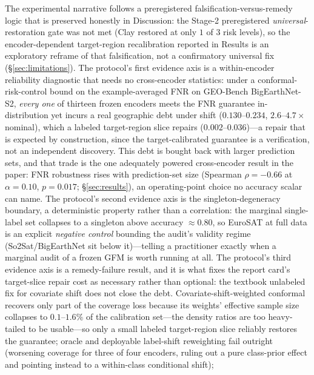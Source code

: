 \documentclass[preprint,11pt,authoryear]{elsarticle}
\begin{document}
 The experimental narrative follows a
preregistered falsification-versus-remedy logic that is preserved honestly in Discussion: the Stage-2 preregistered
\emph{universal}-restoration gate was not met (Clay restored at only $1$ of $3$ risk levels), so the
encoder-dependent target-region recalibration reported in Results is an exploratory reframe of that
falsification, not a confirmatory universal fix (\S\ref{sec:limitations}). The protocol's first evidence
axis is a within-encoder reliability diagnostic that needs no cross-encoder statistics: under a
conformal-risk-control \citep{angelopoulos2024crc} bound on the example-averaged FNR
on GEO-Bench BigEarthNet-S2, \emph{every one} of thirteen frozen encoders meets the FNR guarantee
in-distribution yet incurs a real geographic debt under shift ($0.130$--$0.234$, $2.6$--$4.7\times$
nominal), which a labeled target-region slice repairs ($0.002$--$0.036$)---a repair that is expected by
construction, since the target-calibrated guarantee is a verification, not an independent discovery. This
debt is bought back with larger prediction sets, and that trade is the one adequately powered cross-encoder
result in the paper: FNR robustness rises with prediction-set size (Spearman $\rho=-0.66$ at
$\alpha{=}0.10$, $p{=}0.017$; \S\ref{sec:results}), an operating-point choice no accuracy scalar can
name. The protocol's second evidence axis is the singleton-degeneracy boundary, a deterministic property
rather than a correlation: the marginal single-label set collapses to a singleton above accuracy
$\approx0.80$, so EuroSAT at full data is an explicit \emph{negative control} bounding the audit's validity
regime (So2Sat/BigEarthNet sit below it)---telling a practitioner exactly when a marginal audit of a frozen
GFM is worth running at all. The protocol's third evidence axis is a remedy-failure result, and it is what
fixes the report card's target-slice repair cost as necessary rather than optional: the textbook unlabeled
fix for covariate shift does not close the debt. Covariate-shift-weighted conformal
\citep{tibshirani2019covariate} recovers only part of the coverage loss because its weights' effective
sample size collapses to $0.1$--$1.6\%$ of the calibration set---the density ratios are too heavy-tailed to
be usable---so only a small labeled target-region slice reliably restores the guarantee; oracle and
deployable label-shift reweighting
\citep{lipton2018bbse,podkopaev2021labelshift} fail outright (worsening coverage for three of four
encoders, ruling out a pure class-prior effect and pointing instead to a within-class conditional shift);
\end{document}
